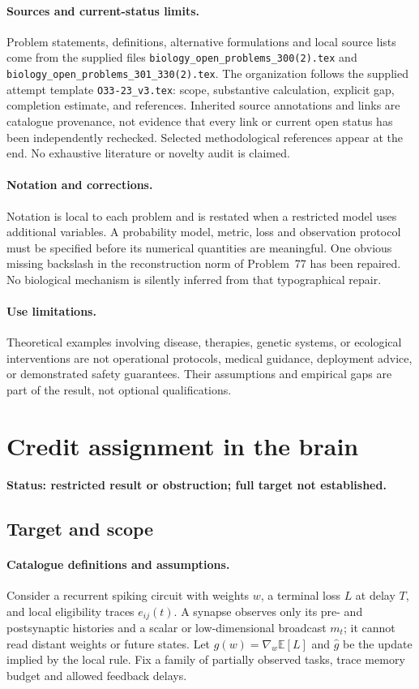 \documentclass[11pt]{article}
\begin{document}
\paragraph{Sources and current-status limits.}
Problem statements, definitions, alternative formulations and local source lists
come from the supplied files
\texttt{biology\_open\_problems\_300(2).tex} and
\texttt{biology\_open\_problems\_301\_330(2).tex}.
The organization follows the supplied attempt template
\texttt{O33-23\_v3.tex}: scope, substantive calculation, explicit gap,
completion estimate, and references. Inherited source annotations and links are
catalogue provenance, not evidence that every link or current open status has
been independently rechecked. Selected methodological references appear at the
end. No exhaustive literature or novelty audit is claimed.

\paragraph{Notation and corrections.}
Notation is local to each problem and is restated when a restricted model uses
additional variables. A probability model, metric, loss and observation protocol
must be specified before its numerical quantities are meaningful. One obvious
missing backslash in the reconstruction norm of Problem~77 has been repaired.
No biological mechanism is silently inferred from that typographical repair.

\paragraph{Use limitations.}
Theoretical examples involving disease, therapies, genetic systems, or ecological
interventions are not operational protocols, medical guidance, deployment advice,
or demonstrated safety guarantees. Their assumptions and empirical gaps are part
of the result, not optional qualifications.


\section*{Credit assignment in the brain}
\label{prob:106}
\noindent\textbf{Status: restricted result or obstruction; full target not established.}
\subsection{Target and scope}
\paragraph{Catalogue definitions and assumptions.}
Consider a recurrent spiking circuit with weights $w$, a terminal loss $L$ at delay $T$, and local eligibility traces $e_{ij}(t)$. A synapse observes only its pre- and postsynaptic histories and a scalar or low-dimensional broadcast $m_t$; it cannot read distant weights or future states. Let $g(w)=\nabla_w\mathbb{E}[L]$ and $\widehat g$ be the update implied by the local rule. Fix a family of partially observed tasks, trace memory budget and allowed feedback delays.
\end{document}
